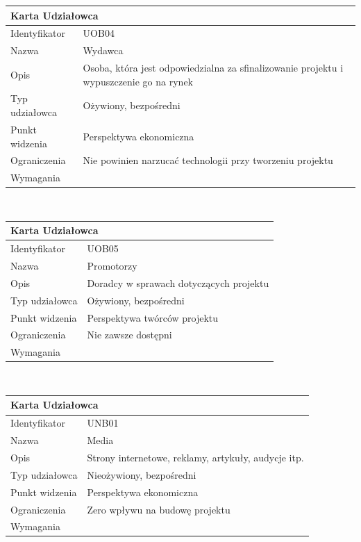 \documentclass[a4paper,11pt]{report}
\begin{document}
	\begin{tabular}{|p{3cm}|p{11cm}|}
	\hline
	\multicolumn{2}{|l|}{\textbf{Karta Udziałowca}}\\
	\hline
	Identyfikator&UOB04\\
	\hline
	Nazwa&Wydawca\\
	\hline
	Opis&Osoba, która jest odpowiedzialna za sfinalizowanie projektu i wypuszczenie go na rynek\\
	\hline
	Typ udziałowca&Ożywiony, bezpośredni\\
	\hline
	Punkt widzenia&Perspektywa ekonomiczna\\
	\hline
	Ograniczenia&Nie powinien narzucać technologii przy tworzeniu projektu\\
	\hline
	Wymagania&\\
	\hline
	\end{tabular}\\
	\begin{tabular}{|p{3cm}|p{11cm}|}
	\hline
	\multicolumn{2}{|l|}{\textbf{Karta Udziałowca}}\\
	\hline
	Identyfikator&UOB05\\
	\hline
	Nazwa&Promotorzy\\
	\hline
	Opis&Doradcy w sprawach dotyczących projektu\\
	\hline
	Typ udziałowca&Ożywiony, bezpośredni\\
	\hline
	Punkt widzenia&Perspektywa twórców projektu\\
	\hline
	Ograniczenia&Nie zawsze dostępni\\
	\hline
	Wymagania&\\
	\hline
	\end{tabular}\\
	\begin{tabular}{|p{3cm}|p{11cm}|}
	\hline
	\multicolumn{2}{|l|}{\textbf{Karta Udziałowca}}\\
	\hline
	Identyfikator&UNB01\\
	\hline
	Nazwa&Media\\
	\hline
	Opis&Strony internetowe, reklamy, artykuły, audycje itp.\\
	\hline
	Typ udziałowca&Nieożywiony, bezpośredni\\
	\hline
	Punkt widzenia&Perspektywa ekonomiczna\\
	\hline
	Ograniczenia&Zero wpływu na budowę projektu\\
	\hline
	Wymagania&\\
	\hline
	\end{tabular}\\
\end{document}
